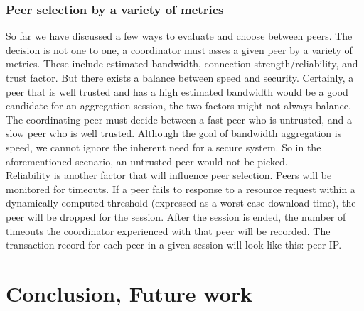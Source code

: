 \documentclass[12pt]{article}
\begin{document}
		\subsubsection{Peer selection by a variety of metrics}

			So far we have discussed a few ways to evaluate and choose between peers. The decision is not one to one, a coordinator must asses a given peer by a variety of metrics. These include estimated bandwidth, connection strength/reliability, and trust factor. But there exists a balance between speed and security. Certainly, a peer that is well trusted and has a high estimated bandwidth would be a good candidate for an aggregation session, the two factors might not always balance. The coordinating peer must decide between a fast peer who is untrusted, and a slow peer who is well trusted. Although the goal of bandwidth aggregation is speed, we cannot ignore the inherent need for a secure system. So in the aforementioned scenario, an untrusted peer would not be picked. \\

			Reliability is another factor that will influence peer selection. Peers will be monitored for timeouts. If a peer fails to response to a resource request within a dynamically computed threshold (expressed as a worst case download time), the peer will be dropped for the session. After the session is ended, the number of timeouts the coordinator experienced with that peer will be recorded. The transaction record for each peer in a given session will look like this:
				peer IP.









\section{Conclusion, Future work}


\listoftodos
\end{document}
